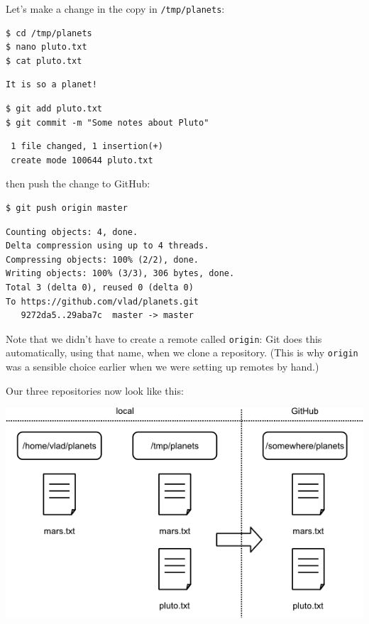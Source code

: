 \documentclass{book}
\begin{document}
Let's make a change in the copy in \texttt{/tmp/planets}:

\begin{verbatim}
$ cd /tmp/planets
$ nano pluto.txt
$ cat pluto.txt
\end{verbatim}

\begin{verbatim}
It is so a planet!
\end{verbatim}

\begin{verbatim}
$ git add pluto.txt
$ git commit -m "Some notes about Pluto"
\end{verbatim}

\begin{verbatim}
 1 file changed, 1 insertion(+)
 create mode 100644 pluto.txt
\end{verbatim}

then push the change to GitHub:

\begin{verbatim}
$ git push origin master
\end{verbatim}

\begin{verbatim}
Counting objects: 4, done.
Delta compression using up to 4 threads.
Compressing objects: 100% (2/2), done.
Writing objects: 100% (3/3), 306 bytes, done.
Total 3 (delta 0), reused 0 (delta 0)
To https://github.com/vlad/planets.git
   9272da5..29aba7c  master -> master
\end{verbatim}

Note that we didn't have to create a remote called \texttt{origin}: Git
does this automatically, using that name, when we clone a repository.
(This is why \texttt{origin} was a sensible choice earlier when we were
setting up remotes by hand.)

Our three repositories now look like this:

\includegraphics{novice/git/img/git-after-change-to-duplicate-repo.png}
\end{document}
